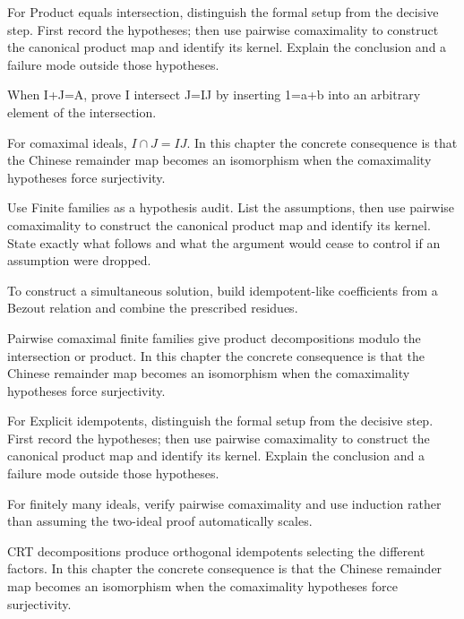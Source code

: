 \begin{exercise}\label{exr:v04-03}
For Product equals intersection, distinguish the formal setup from the decisive step. First record the hypotheses; then use pairwise comaximality to construct the canonical product map and identify its kernel. Explain the conclusion and a failure mode outside those hypotheses.
\end{exercise}
\begin{hint}
When I+J=A, prove I intersect J=IJ by inserting 1=a+b into an arbitrary element of the intersection.
\end{hint}
\begin{solution}
For comaximal ideals, $I\cap J=IJ$. In this chapter the concrete consequence is that the Chinese remainder map becomes an isomorphism when the comaximality hypotheses force surjectivity.
\end{solution}

\begin{exercise}\label{exr:v04-04}
Use Finite families as a hypothesis audit. List the assumptions, then use pairwise comaximality to construct the canonical product map and identify its kernel. State exactly what follows and what the argument would cease to control if an assumption were dropped.
\end{exercise}
\begin{hint}
To construct a simultaneous solution, build idempotent-like coefficients from a Bezout relation and combine the prescribed residues.
\end{hint}
\begin{solution}
Pairwise comaximal finite families give product decompositions modulo the intersection or product. In this chapter the concrete consequence is that the Chinese remainder map becomes an isomorphism when the comaximality hypotheses force surjectivity.
\end{solution}

\begin{exercise}\label{exr:v04-05}
For Explicit idempotents, distinguish the formal setup from the decisive step. First record the hypotheses; then use pairwise comaximality to construct the canonical product map and identify its kernel. Explain the conclusion and a failure mode outside those hypotheses.
\end{exercise}
\begin{hint}
For finitely many ideals, verify pairwise comaximality and use induction rather than assuming the two-ideal proof automatically scales.
\end{hint}
\begin{solution}
CRT decompositions produce orthogonal idempotents selecting the different factors. In this chapter the concrete consequence is that the Chinese remainder map becomes an isomorphism when the comaximality hypotheses force surjectivity.
\end{solution}

